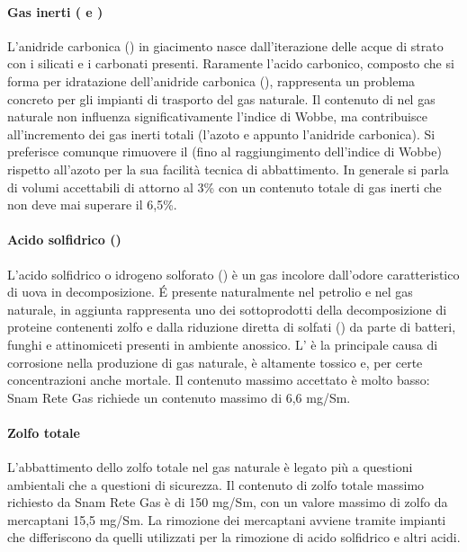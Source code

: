 \paragraph{Gas inerti ( e )}
L'anidride carbonica () in giacimento nasce dall'iterazione delle acque di strato con i silicati e i carbonati presenti. Raramente l'acido carbonico, composto che si forma per idratazione dell'anidride carbonica (), rappresenta un problema concreto per gli impianti di trasporto del gas naturale. Il contenuto di  nel gas naturale non influenza significativamente l'indice di Wobbe, ma contribuisce all'incremento dei gas inerti totali (l'azoto  e appunto l'anidride carbonica). Si preferisce comunque rimuovere il  (fino al raggiungimento dell'indice di Wobbe) rispetto all'azoto per la sua facilità tecnica di abbattimento. In generale si parla di volumi accettabili di  attorno al 3\% con un contenuto totale di gas inerti che non deve mai superare il 6,5\%.

\paragraph{Acido solfidrico ()}
L'acido solfidrico o idrogeno solforato () è un gas incolore dall'odore caratteristico di uova in decomposizione. \'E presente naturalmente nel petrolio e nel gas naturale, in aggiunta rappresenta uno dei sottoprodotti della decomposizione di proteine contenenti zolfo e dalla riduzione diretta di solfati () da parte di batteri, funghi e attinomiceti presenti in ambiente anossico. L' è la principale causa di corrosione nella produzione di gas naturale, è altamente tossico e, per certe concentrazioni anche mortale. Il contenuto massimo accettato è molto basso: Snam Rete Gas richiede un contenuto massimo di 6,6 mg/Sm.

\paragraph{Zolfo totale}
L'abbattimento dello zolfo totale nel gas naturale è legato più a questioni ambientali che a questioni di sicurezza. Il contenuto di zolfo totale massimo richiesto da Snam Rete Gas è di 150 mg/Sm, con un valore massimo di zolfo da mercaptani 15,5 mg/Sm. La rimozione dei mercaptani avviene tramite impianti che differiscono da quelli utilizzati per la rimozione di acido solfidrico e altri acidi.

